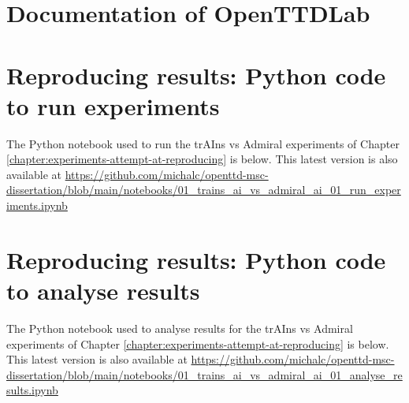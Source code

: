 \documentclass[logo,msc,dsti]{style/infthesis}    %
\begin{document}
{%



\printbibliography[heading=bibliography,title={Bibliography}]


\appendix

\chapter{Documentation of OpenTTDLab}
\label{chapter:openttdlab-documentation}



\chapter{Reproducing results: Python code to run experiments}
\label{chapter:trains-vs-admiral-run-experiments}

The Python notebook used to run the trAIns vs Admiral experiments of Chapter \ref{chapter:experiments-attempt-at-reproducing} is below. This latest version is also available at \url{https://github.com/michalc/openttd-msc-dissertation/blob/main/notebooks/01_trains_ai_vs_admiral_ai_01_run_experiments.ipynb}



\chapter{Reproducing results: Python code to analyse results}
\label{chapter:trains-vs-admiral-analyse-results}

The Python notebook used to analyse results for the trAIns vs Admiral experiments of Chapter \ref{chapter:experiments-attempt-at-reproducing} is below. This latest version is also available at \url{https://github.com/michalc/openttd-msc-dissertation/blob/main/notebooks/01_trains_ai_vs_admiral_ai_01_analyse_results.ipynb}

}
\end{document}
